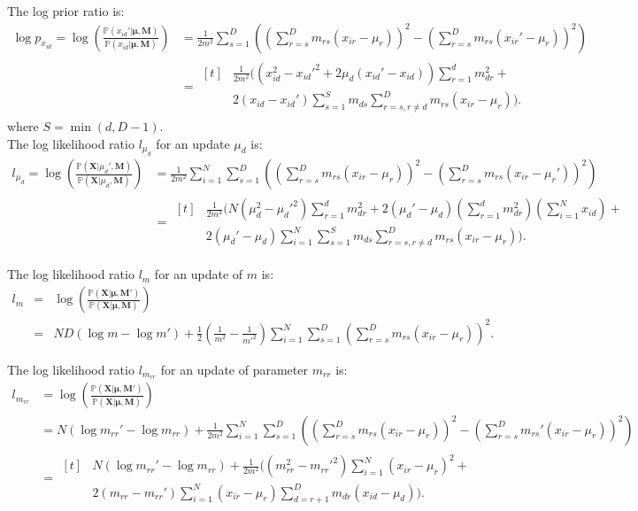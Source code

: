 \documentclass[a4paper,11pt]{article}
\def\M{\boldsymbol{M}}
\def\X{\boldsymbol{X}}
\def\bmu{\boldsymbol{\mu}}
\def\p{\mathbb{P}}
\def\mrr{m_{rr}}
\begin{document}
The log prior ratio is:
\begin{align*}
\log p_{x_{id}} = \log \left( \frac{\p(x_{id}' | \bmu, \M)}{\p(x_{id} | \bmu, \M)} \right) &= \frac{1}{2m^2}\sum_{s = 1}^{D}\left( \left(\sum_{r = s}^{D}m_{rs} (x_{ir} - \mu_r) \right)^2- \left(\sum_{r = s}^{D}m_{rs} (x_{ir}' - \mu_r) \right)^2 \right)\\
&= \begin{aligned}[t]
& \frac{1}{2m^2}\Bigg(\left(x_{id}^2 - x_{id}'^2 + 2\mu_d(x_{id}' - x_{id})\right) \sum_{r=1}^{d} m_{dr}^2  + \\
&   2(x_{id} - x_{id}') \sum_{s=1}^{S} m_{ds} \sum_{r=s, r \neq d}^{D} m_{rs}(x_{ir} - \mu_r) \Bigg).
 \end{aligned}
\end{align*}
where $S = \min(d,D-1)$.\\
The log likelihood ratio $l_{\mu_d}$ for an update $\mu_d$ is:
\begin{align*}
l_{\mu_d} = \log \left( \frac{\p(\X | \mu_d', \M)}{\p(\X | \mu_d, \M)} \right) &= \frac{1}{2m^2}\sum_{i=1}^N \sum_{s = 1}^{D}\left( \left(\sum_{r = s}^{D}m_{rs} (x_{ir} - \mu_r) \right)^2- \left(\sum_{r = s}^{D}m_{rs} (x_{ir} - \mu_r') \right)^2 \right)\\
&= \begin{aligned}[t]
& \frac{1}{2m^2}\Bigg(N(\mu_d^2 - \mu_d'^2) \sum_{r=1}^{d} m_{dr}^2 +
 2(\mu_d' -\mu_d) \left(\sum_{r=1}^d m_{dr}^2\right) \left(\sum_{i=1}^N x_{id}\right) + \\
&   2(\mu_d' -\mu_d) \sum_{i=1}^N \sum_{s=1}^{S} m_{ds} \sum_{r=s, r \neq d}^{D} m_{rs}(x_{ir} - \mu_r) \Bigg).
 \end{aligned}
\end{align*}

The log likelihood ratio $l_{m}$ for an update of $m$ is:
\begin{eqnarray*}
l_{m} &=& \log \left( \frac{\p(\X | \bmu, \M')}{\p(\X | \bmu, \M)} \right) \\
 &=& ND(\log m - \log m') + \frac{1}{2}\left(\frac{1}{m^2} - \frac{1}{m'^2} \right) \sum_{i=1}^N \sum_{s = 1}^{D} \left(\sum_{r = s}^{D}m_{rs} (x_{ir} - \mu_r) \right)^2.
\end{eqnarray*}

The log likelihood ratio $l_{\mrr}$ for an update of parameter $m_{rr}$ is:
\begin{align*}
l_{\mrr} &= \log \left( \frac{\p(\X | \bmu, \M')}{\p(\X | \bmu, \M)} \right) \\
 &= N(\log \mrr' - \log \mrr) + \frac{1}{2m^2}\sum_{i=1}^N \sum_{s = 1}^{D}\left( \left(\sum_{r = s}^{D}m_{rs} (x_{ir} - \mu_r) \right)^2- \left(\sum_{r = s}^{D}m_{rs}' (x_{ir} - \mu_r) \right)^2 \right)\\
 &= \begin{aligned}[t]
 & N(\log \mrr' - \log \mrr) + \frac{1}{2m^2}\Big((\mrr^2 - \mrr'^2) \sum_{i=1}^N (x_{ir} - \mu_r)^2 +\\
 & 2(\mrr - \mrr')\sum_{i=1}^N (x_{ir} - \mu_r) \sum_{d=r+1}^D m_{dr}(x_{id} - \mu_d)\Big).
 \end{aligned}
\end{align*}
\end{document}
